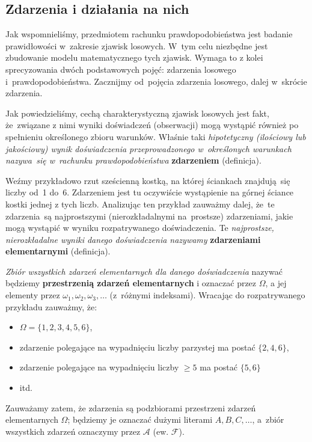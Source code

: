 \documentclass[10pt,a4paper]{article}
\numberwithin{equation}{subsection}
\begin{document}
\subsection{Zdarzenia i działania na nich}
Jak wspomnieliśmy, przedmiotem rachunku prawdopodobieństwa jest badanie
prawidłowości w~zakresie zjawisk losowych. W~tym celu niezbędne jest zbudowanie
modelu matematycznego tych zjawisk. Wymaga to z kolei sprecyzowania dwóch
podstawowych pojęć: zdarzenia losowego i~prawdopodobieństwa. Zacznijmy
od~pojęcia zdarzenia losowego, dalej w~skrócie zdarzenia.

Jak powiedzieliśmy, cechą charakterystyczną zjawisk losowych jest fakt,
że~związane z nimi wyniki doświadczeń (obserwacji) mogą wystąpić również
po spełnieniu określonego zbioru warunków. Właśnie taki \textit{hipotetyczny
 (ilościowy lub jakościowy) wynik doświadczenia przeprowadzonego w~określonych
warunkach nazywa~się w~rachunku prawdopodobieństwa} \textbf{zdarzeniem} (definicja).

Weźmy przykładowo rzut sześcienną kostką, na której ściankach znajdują~się
liczby od~1 do~6. Zdarzeniem jest tu oczywiście wystąpienie na górnej ściance
kostki jednej z tych liczb. Analizując ten przykład zauważmy dalej, że~te
zdarzenia~są najprostszymi (nierozkładalnymi na~prostsze) zdarzeniami, jakie
mogą wystąpić w wyniku rozpatrywanego doświadczenia. Te \textit{najprostsze,
nierozkładalne wyniki danego doświadczenia nazywamy} \textbf{zdarzeniami
elementarnymi} (definicja).

\textit{Zbiór wszystkich zdarzeń elementarnych dla danego doświadczenia} nazywać
będziemy \textbf{przestrzenią zdarzeń elementarnych} i oznaczać przez $\Omega$,
a jej elementy przez $\omega_1, \omega_2, \omega_3,\dotsc$ (z~różnymi indeksami).
Wracając do rozpatrywanego przykładu zauważmy, że:
\begin{itemize}
  \item $\Omega = \{1, 2, 3, 4, 5, 6\}$,
  \item zdarzenie polegające na wypadnięciu liczby parzystej ma postać
    $\{2,4,6\}$,
  \item zdarzenie polegające na wypadnięciu liczby $\geq5$ ma postać $\{5, 6\}$
  \item itd.
\end{itemize}

Zauważamy zatem, że zdarzenia są podzbiorami przestrzeni zdarzeń elementarnych
$\Omega$; będziemy je oznaczać dużymi literami $A, B, C,\dotsc$, a~zbiór
wszystkich zdarzeń oznaczymy przez $\mathscr{A}$ (ew. $\mathscr{F}$).
\end{document}
